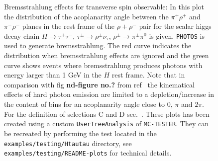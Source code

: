 \documentclass[]{Photos_interface_design}
\begin{document}
\begin{figure}[h!]
\centering
{}
\caption{Bremsstrahlung effects for transverse spin observable: In
  this plot the distribution of the acoplanarity angle between
  the $\pi^+\rho^+$ and $\pi^-\rho^-$ planes in the rest frame of the
  $\rho+ \rho^-$ pair for the scalar higgs decay chain $H\to
  \tau^+\tau^-$, $\tau^\pm \to \rho^\pm \nu_\tau$, $\rho^\pm \to
  \pi^\pm \pi^0$ is given. {\tt PHOTOS} is used to generate
  bremsstrahlung.  The red curve indicates the distribution when
  bremsstrahlung effects are ignored and the green curve shows events
  where bremsstrahlung produces photons with energy larger than 1 GeV
  in the $H$ rest frame. Note that in comparison with fig \textbf{nd-figure no.?} from
  ref~\cite{tauolaC++} the kinematical effects of hard photon emission are
  limited to a depletion/increase in the content of bins for an acoplanarity
  angle close to $0$, $\pi$ and $2\pi$. For the definition of selections C
  and D see.~\cite{Bower:2002zx}.  These plots has been created using
  a custom {\tt UserTreeAnalysis} of {\tt MC-TESTER}.  They can be
  recreated by performing the test located in the {\tt
    examples/testing/Htautau} directory, see {\tt
    examples/testing/README-plots} for technical details.
\label{fig:acoplanarity}
}
\end{figure}
\end{document}
